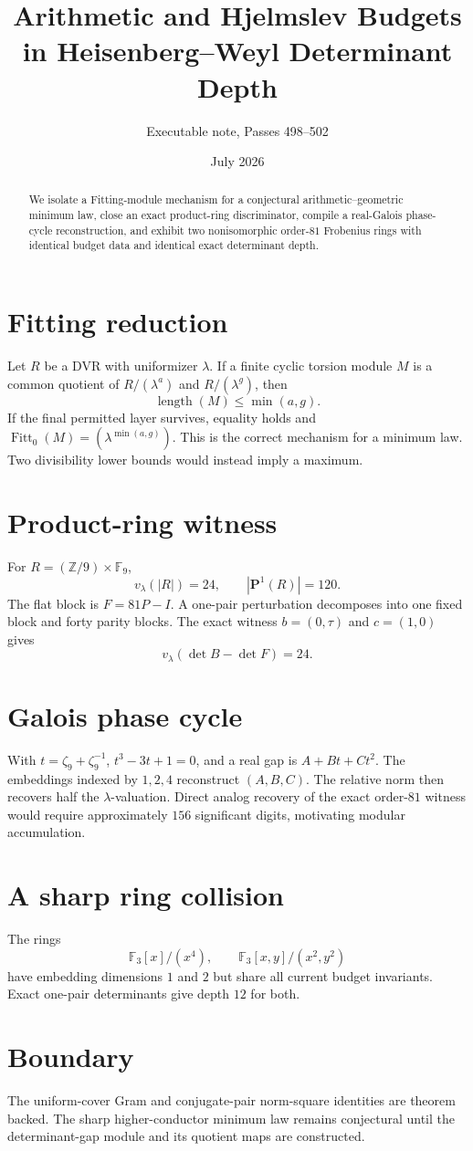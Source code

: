 \documentclass[11pt]{article}
\title{Arithmetic and Hjelmslev Budgets in Heisenberg--Weyl Determinant Depth}
\author{Executable note, Passes 498--502}
\date{July 2026}
\begin{document}
\maketitle
\begin{abstract}
We isolate a Fitting-module mechanism for a conjectural arithmetic--geometric
minimum law, close an exact product-ring discriminator, compile a real-Galois
phase-cycle reconstruction, and exhibit two nonisomorphic order-$81$ Frobenius
rings with identical budget data and identical exact determinant depth.
\end{abstract}

\section{Fitting reduction}
Let $R$ be a DVR with uniformizer $\lambda$. If a finite cyclic torsion module
$M$ is a common quotient of $R/(\lambda^a)$ and $R/(\lambda^g)$, then
\[
 \operatorname{length}(M)\le \min(a,g).
\]
If the final permitted layer survives, equality holds and
$\operatorname{Fitt}_0(M)=(\lambda^{\min(a,g)})$. This is the correct mechanism
for a minimum law. Two divisibility lower bounds would instead imply a maximum.

\section{Product-ring witness}
For $R=(\mathbb Z/9)\times\mathbb F_9$,
\[
 v_\lambda(|R|)=24,\qquad |\mathbf P^1(R)|=120.
\]
The flat block is $F=81P-I$. A one-pair perturbation decomposes into one fixed
block and forty parity blocks. The exact witness $b=(0,\tau)$ and $c=(1,0)$ gives
\[
 v_\lambda(\det B-\det F)=24.
\]

\section{Galois phase cycle}
With $t=\zeta_9+\zeta_9^{-1}$, $t^3-3t+1=0$, and a real gap is
$A+Bt+Ct^2$. The embeddings indexed by $1,2,4$ reconstruct $(A,B,C)$. The
relative norm then recovers half the $\lambda$-valuation. Direct analog recovery
of the exact order-$81$ witness would require approximately $156$ significant
digits, motivating modular accumulation.

\section{A sharp ring collision}
The rings
\[
 \mathbb F_3[x]/(x^4),\qquad \mathbb F_3[x,y]/(x^2,y^2)
\]
have embedding dimensions $1$ and $2$ but share all current budget invariants.
Exact one-pair determinants give depth $12$ for both.

\section{Boundary}
The uniform-cover Gram and conjugate-pair norm-square identities are theorem
backed. The sharp higher-conductor minimum law remains conjectural until the
determinant-gap module and its quotient maps are constructed.
\end{document}
